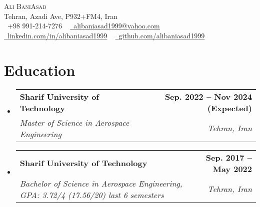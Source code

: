 \documentclass[letterpaper,11pt]{article}
\makeatletter
\newcommand{\resumeSubheading}[4]{
  \vspace{-2pt}\item
    \begin{tabular*}{1.0\textwidth}[t]{l@{\extracolsep{\fill}}r}
      \textbf{ #1} & \textbf{\small #2} \\
      \textsl{\small #3} & \textit{\small #4} \\
    \end{tabular*}\vspace{-7pt}
}
\newcommand{\resumeSubHeadingListStart}{\begin{itemize}[leftmargin=0.0in, label={}]}
\newcommand{\resumeSubHeadingListEnd}{\end{itemize}}
\makeatother
\begin{document}
\begin{center}
    {\Huge \scshape Ali BaniAsad} \\ \vspace{1pt}
    Tehran, Azadi Ave, P932+FM4, Iran \\ \vspace{1pt}
    \small \raisebox{-0.1\height}\faPhone\ +98 991-214-7276 ~ \href{mailto:alibaniasad1999@yahoo.com}{\raisebox{-0.2\height}\faEnvelope\  \underline{alibaniasad1999@yahoo.com}} ~ 
    \href{https://linkedin.com/in/alibaniasad1999/}{\raisebox{-0.2\height}\faLinkedin\ \underline{linkedin.com/in/alibaniasad1999}}  ~
    \href{https://github.com/alibaniasad1999}{\raisebox{-0.2\height}\faGithub\ \underline{github.com/alibaniasad1999}}
    \vspace{-8pt}
\end{center}


\section{Education}
  \resumeSubHeadingListStart
  
  \resumeSubheading
  {Sharif University of Technology}{Sep. 2022 -- Nov 2024 (Expected)}
  {Master of Science in Aerospace Engineering}{Tehran, Iran}
  \vspace{-3pt}
  
    \resumeSubheading
      {Sharif University of Technology}{Sep. 2017 -- May 2022}
      {Bachelor of Science in Aerospace Engineering,
      GPA: 3.72/4 (17.56/20) last 6 semesters
      }{Tehran, Iran}
      
      
      
  \resumeSubHeadingListEnd
  
  
 \vspace{-18pt}
\end{document}
